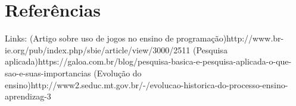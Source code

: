 \documentclass[12pt]{article}
\begin{document}
	
	
	\section{Referências} 
	
	Links: 	(Artigo sobre uso de jogos no ensino de programação)http://www.br-ie.org/pub/index.php/sbie/article/view/3000/2511
			(Pesquisa aplicada)https://galoa.com.br/blog/pesquisa-basica-e-pesquisa-aplicada-o-que-sao-e-suas-importancias
			(Evolução do ensino)http://www2.seduc.mt.gov.br/-/evolucao-historica-do-processo-ensino-aprendizag-3
	
	
	
\end{document}
